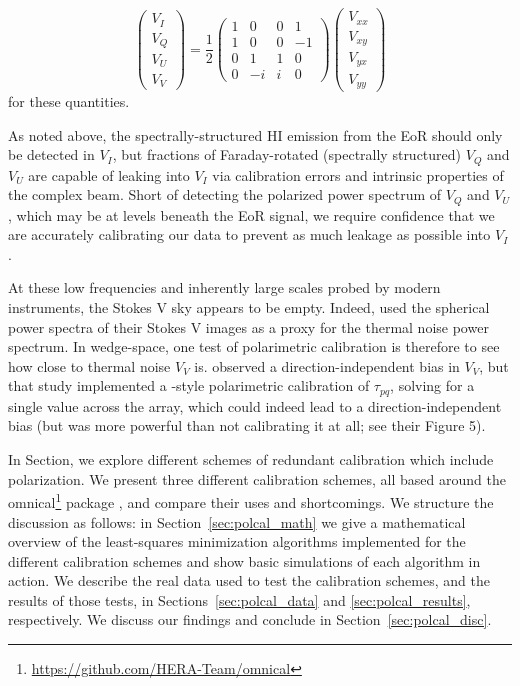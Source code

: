 \begin{equation}
\left(\begin{array}{c}
V_{I}\\
V_{Q}\\
V_{U}\\
V_{V}\end{array} \right)
= \frac{1}{2}
\left( \begin{array}{cccc}
1 & 0 & 0 & 1 \\
1 & 0 & 0 & -1 \\
0 & 1 & 1 & 0 \\
0 & -i & i & 0 \end{array} \right) 
\left(\begin{array}{c}
V_{xx}\\
V_{xy}\\
V_{yx}\\
V_{yy}\end{array} \right) 
\label{eq:polcal_pseudo-stokes}
\end{equation}
for these quantities.

As noted above, the spectrally-structured HI emission from the EoR should only be detected in $V_{I}$, but fractions of Faraday-rotated (spectrally structured) $V_{Q}$ and $V_{U}$ are capable of leaking into $V_{I}$ via calibration errors and intrinsic properties of the complex beam. Short of detecting the polarized power spectrum of $V_{Q}$ and $V_{U}$, which may be at levels beneath the EoR signal, we require confidence that we are accurately calibrating our data to prevent as much leakage as possible into $V_{I}$. 

At these low frequencies and inherently large scales probed by modern instruments, the Stokes V sky appears to be empty. Indeed, \citet{Patil.17} used the spherical power spectra of their Stokes V images as a proxy for the thermal noise power spectrum. In wedge-space, one test of polarimetric calibration is therefore to see how close to thermal noise $V_{V}$ is. 
\citet{Kohn.16} observed a direction-independent bias in $V_{V}$, but that study implemented a \citet{Moore.17}-style polarimetric calibration of $\tau_{pq}$, solving for a single value across the array, which could indeed lead to a direction-independent bias (but was more powerful than not calibrating it at all; see their Figure 5).

In Section, we explore different schemes of redundant calibration which include polarization. We present three different calibration schemes, all based around the {\sc omnical}\footnote{\url{https://github.com/HERA-Team/omnical}} package \citep{Zheng.14}, and compare their uses and shortcomings. We structure the discussion as follows: in Section~\ref{sec:polcal_math} we give a mathematical overview of the least-squares minimization algorithms implemented for the different calibration schemes and show basic simulations of each algorithm in action. We describe the real data used to test the calibration schemes, and the results of those tests, in Sections~\ref{sec:polcal_data} and \ref{sec:polcal_results}, respectively. We discuss our findings and conclude in Section~\ref{sec:polcal_disc}.

